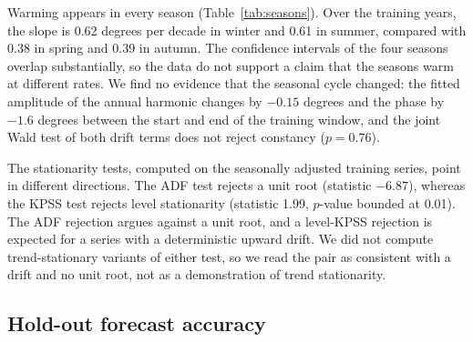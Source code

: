 \documentclass[11pt]{article}
\begin{document}
Warming appears in every season (Table~\ref{tab:seasons}). Over the training years, the slope is 0.62 degrees per decade in winter and 0.61 in summer, compared with 0.38 in spring and 0.39 in autumn.
The confidence intervals of the four seasons overlap substantially, so the data do not support a claim that the seasons warm at different rates. We find no evidence that the seasonal cycle changed: the fitted amplitude of the annual harmonic changes by $-0.15$ degrees and the phase by $-1.6$ degrees between the start and end of the training window, and the joint Wald test of both drift terms does not reject constancy ($p=0.76$).



The stationarity tests, computed on the seasonally adjusted training series, point in different directions. The ADF test rejects a unit root (statistic $-6.87$), whereas the KPSS test rejects level stationarity (statistic 1.99, $p$-value bounded at 0.01).
The ADF rejection argues against a unit root, and a level-KPSS rejection is expected for a series with a deterministic upward drift. We did not compute trend-stationary variants of either test, so we read the pair as consistent with a drift and no unit root, not as a demonstration of trend stationarity.



\subsection{Hold-out forecast accuracy}
\end{document}
